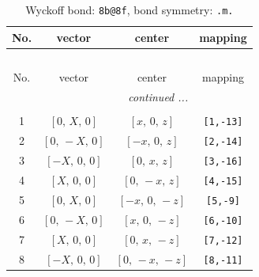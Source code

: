 \documentclass[fleqn,8pt]{jsarticle}
\begin{document}
\begin{longtable}{cccc}
\caption{Wyckoff bond: {\tt 8b@8f}, bond symmetry: {\tt .m.}}
 \\
 \hline \hline
No. & vector & center & mapping \\ \hline \endfirsthead

\multicolumn{3}{l}{\tablename\ \thetable{}} \\
 \hline \hline
No. & vector & center & mapping \\ \hline \endhead

 \hline \hline
\multicolumn{3}{r}{\footnotesize\it continued ...} \\ \endfoot

 \hline \hline
\multicolumn{3}{r}{} \\ \endlastfoot

1 & $\left[ 0,\, X,\, 0 \right]$ & $\left[ x,\, 0,\, z \right]$ & {\tt [1,-13]} \\ \hline
2 & $\left[ 0,\, - X,\, 0 \right]$ & $\left[ - x,\, 0,\, z \right]$ & {\tt [2,-14]} \\ \hline
3 & $\left[ - X,\, 0,\, 0 \right]$ & $\left[ 0,\, x,\, z \right]$ & {\tt [3,-16]} \\ \hline
4 & $\left[ X,\, 0,\, 0 \right]$ & $\left[ 0,\, - x,\, z \right]$ & {\tt [4,-15]} \\ \hline
5 & $\left[ 0,\, X,\, 0 \right]$ & $\left[ - x,\, 0,\, - z \right]$ & {\tt [5,-9]} \\ \hline
6 & $\left[ 0,\, - X,\, 0 \right]$ & $\left[ x,\, 0,\, - z \right]$ & {\tt [6,-10]} \\ \hline
7 & $\left[ X,\, 0,\, 0 \right]$ & $\left[ 0,\, x,\, - z \right]$ & {\tt [7,-12]} \\ \hline
8 & $\left[ - X,\, 0,\, 0 \right]$ & $\left[ 0,\, - x,\, - z \right]$ & {\tt [8,-11]} \\
\end{longtable}
\renewcommand{\arraystretch}{1.2}
\end{document}

